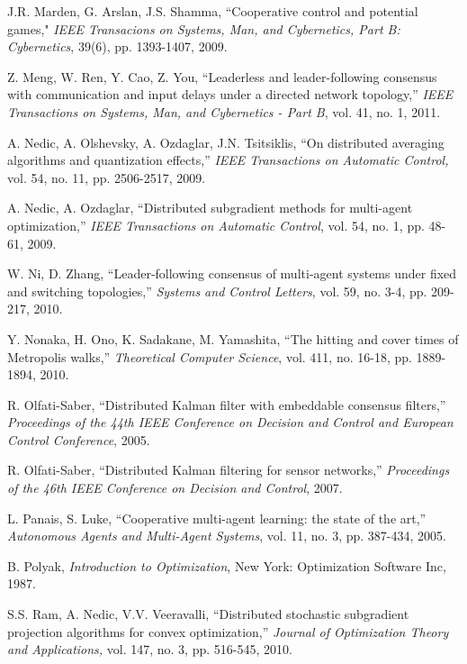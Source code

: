 \documentclass[final]{siamltex}
\begin{document}
\begin{thebibliography}{99}
 J.R. Marden, G. Arslan, J.S. Shamma, ``Cooperative control and potential games," {\em IEEE Transacions on Systems, Man, and Cybernetics, Part B: Cybernetics}, 39(6), pp. 1393-1407, 2009. 

 Z. Meng, W. Ren, Y. Cao, Z. You, ``Leaderless and leader-following consensus with communication and input delays under a directed network topology,'' {\em IEEE Transactions on Systems, Man, and Cybernetics - Part B}, vol. 41, no. 1, 2011. 

 A. Nedic, A. Olshevsky, A. Ozdaglar, J.N. Tsitsiklis, ``On distributed averaging algorithms
and quantization effects,'' {\em IEEE Transactions on Automatic Control,} vol. 54, no. 11, pp. 2506-2517, 2009.

 A. Nedic, A. Ozdaglar, ``Distributed subgradient methods for multi-agent optimization,''
{\em IEEE Transactions on Automatic Control}, vol. 54, no. 1, pp. 48-61, 2009.

 W. Ni, D. Zhang, ``Leader-following consensus of multi-agent systems under fixed and switching topologies,''
{\em Systems and Control Letters}, vol. 59, no. 3-4, pp. 209-217, 2010.

 Y. Nonaka, H. Ono, K. Sadakane, M. Yamashita, ``The hitting and cover times of Metropolis walks,'' 
{\em Theoretical Computer Science}, 
vol. 411, no. 16-18, pp. 1889-1894, 2010.

 R. Olfati-Saber, 	``Distributed Kalman filter with embeddable consensus filters,'' 
{\em Proceedings of the 44th IEEE Conference on Decision and Control and European Control Conference}, 2005. 

 R. Olfati-Saber, ``Distributed Kalman filtering for sensor networks,'' {\em Proceedings of the 46th
IEEE Conference on Decision and Control}, 2007. 

 L. Panais, S. Luke, ``Cooperative multi-agent learning: the state of the art,'' {\em Autonomous 
Agents and Multi-Agent Systems}, vol. 11, no. 3, pp. 387-434, 2005. 

 B. Polyak, {\em Introduction to Optimization}, New York: Optimization Software Inc, 1987. 

 S.S. Ram, A. Nedic, V.V. Veeravalli, ``Distributed stochastic subgradient projection algorithms for convex optimization,'' 
{\em Journal of Optimization Theory and Applications,} vol. 147, no. 3, pp. 516-545, 2010.


\end{thebibliography}
\end{document}
